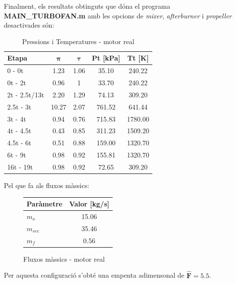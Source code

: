 Finalment, els resultats obtinguts que dóna el programa \textbf{MAIN\_TURBOFAN.m} amb les opcions de \textit{mixer}, \textit{afterburner} i \textit{propeller} desactivades són:
\begin{table}[H]
\centering
\begin{tabular}{lcccc}
\toprule[3pt]
\textbf{Etapa} &\textbf{$\bm{\pi}$} & \textbf{$\bm{\tau}$}    & \textbf{Pt} [kPa]  & \textbf{Tt} [K]  \\
\midrule[1pt]
0 - 0t     & 1.23   & 1.06  & 35.10   & 240.22             \\
0t - 2t     & 0.96   & 1  & 33.70   & 240.22             \\
2t - 2.5t/13t     & 2.20   & 1.29  & 74.13   & 309.20             \\
2.5t - 3t     & 10.27  & 2.07  & 761.52   & 641.44             \\
3t - 4t     & 0.94     & 0.76  & 715.83  & 1780.00             \\
4t - 4.5t     & 0.43   & 0.85  & 311.23   & 1509.20             \\
4.5t - 6t     & 0.51   & 0.88  & 159.00   & 1320.70             \\
6t - 9t     & 0.98   & 0.92  & 155.81   & 1320.70            \\
16t - 19t     & 0.98   & 0.92  & 72.65   & 309.20            \\
\bottomrule[2pt]
\end{tabular}
\caption{Pressions i Temperatures - motor real}
\end{table}
Pel que fa als fluxos màssics:
\begin{figure}[H]
	\centering
	\begin{tabular}{lc}
		\toprule[3pt]
		\textbf{Paràmetre}&\textbf{Valor [kg/s]}\\
		\midrule[1pt]
		$m_{o}$ & 15.06 \\
		$m_{sec}$ & 35.46 \\
		$m_{f}$ & 0.56 \\
		\bottomrule[2pt]
	\end{tabular}
	\label{C_opti2}
	\caption{Fluxos màssics - motor real}
\end{figure}
Per aquesta configuració s'obté una empenta adimensonal de $\bm{\hat{F} = 5.5}$.